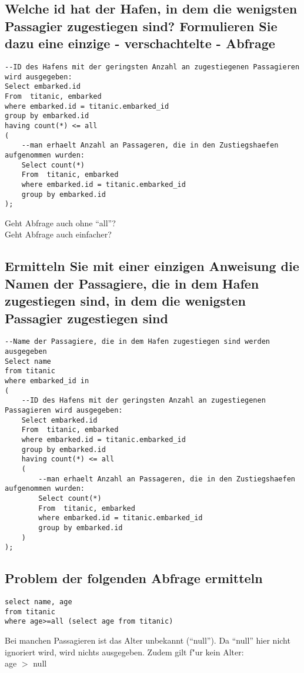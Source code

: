 \documentclass[a4paper, 11pt, titlepage]{article}
\begin{document}
\subsection{Welche id hat der Hafen, in dem die wenigsten Passagier zugestiegen sind? Formulieren Sie 
dazu eine einzige - verschachtelte - Abfrage}
\begin{lstlisting}[style = sql]
--ID des Hafens mit der geringsten Anzahl an zugestiegenen Passagieren wird ausgegeben:
Select embarked.id
From  titanic, embarked
where embarked.id = titanic.embarked_id	
group by embarked.id
having count(*) <= all	
(
	--man erhaelt Anzahl an Passageren, die in den Zustiegshaefen aufgenommen wurden:
	Select count(*)
	From  titanic, embarked
	where embarked.id = titanic.embarked_id
	group by embarked.id	
); 

\end{lstlisting}
Geht Abfrage auch ohne "`all"'?\\
Geht Abfrage auch einfacher?
\newpage
\subsection{Ermitteln Sie mit einer einzigen Anweisung die Namen der Passagiere, die in dem Hafen 
zugestiegen sind, in dem die wenigsten Passagier zugestiegen sind}
\begin{lstlisting}[style = sql]
--Name der Passagiere, die in dem Hafen zugestiegen sind werden ausgegeben
Select name
from titanic
where embarked_id in 
(
	--ID des Hafens mit der geringsten Anzahl an zugestiegenen Passagieren wird ausgegeben:
	Select embarked.id
	From  titanic, embarked
	where embarked.id = titanic.embarked_id
	group by embarked.id
	having count(*) <= all
	(
		--man erhaelt Anzahl an Passageren, die in den Zustiegshaefen aufgenommen wurden:
		Select count(*)
		From  titanic, embarked
		where embarked.id = titanic.embarked_id
		group by embarked.id	
	) 
);
\end{lstlisting}
\subsection{Problem der folgenden Abfrage ermitteln}
\begin{lstlisting}[style = sql]
select name, age 
from titanic 
where age>=all (select age from titanic)
\end{lstlisting}
Bei manchen Passagieren ist das Alter unbekannt ("`null"'). Da "`null"' hier nicht ignoriert wird, wird nichts ausgegeben. Zudem gilt f"ur kein Alter:\\
age $>$ null
\end{document}
